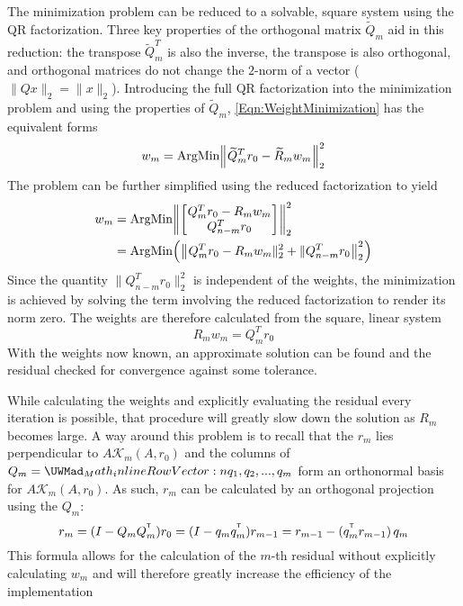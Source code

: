\documentclass[12pt]{UWMadThesis}
\begin{document}
The minimization problem can be reduced to a solvable, square system using the QR factorization.
Three key properties of the orthogonal matrix $\widetilde{Q}_m$ aid in this reduction: the transpose $\widetilde{Q}^T_m$ is also the inverse, the transpose is also orthogonal, and orthogonal matrices do not change the $2$-norm of a vector ($\|Qx\|_2 = \|x\|_2 $).
Introducing the full QR factorization into the minimization problem and using the properties of $\widetilde{Q}_m$, \cref{Eqn:WeightMinimization} has the equivalent forms
\begin{equation}
    w_m =\ArgMin\left\|\widetilde{Q}^T_m  r_0 - \widetilde{R}_m w_m \right\|_2^2
\end{equation}
The problem can be further simplified using the reduced factorization to yield
\begin{align*}
    w_m &= \ArgMin\left\|
                \begin{bmatrix}
                    Q^T_m  r_0 - R_m w_m \\
                    Q^T_{n-m} r_0
                \end{bmatrix}
            \right\|_2^2 \\
        &= \ArgMin  \left(
                        \left\|Q^T_m  r_0 - R_m w_m\|_2^2 + \|Q^T_{n-m}r_0\right\|_2^2
                    \right)
\end{align*}
Since the quantity $\|Q^T_{n-m}r_0\|_2^2$ is independent of the weights, the minimization is achieved by solving the term involving the reduced factorization to render its norm zero.
The weights are therefore calculated from the square, linear system
\begin{equation}
    R_m w_m = Q^T_m  r_0
\end{equation}
With the weights now known, an approximate solution can be found and the residual checked for convergence against some tolerance.

While calculating the weights and explicitly evaluating the residual every iteration is possible, that procedure will greatly slow down the solution as $R_m$ becomes large.
A way around this problem is to recall that the $r_m$ lies perpendicular to $A\mathcal{K}_m(A,r_0)$ and the columns of $Q_m = \irowvec{q_1,q_2,...,q_m}$ form an orthonormal basis for $A\mathcal{K}_m(A,r_0)$.
As such, $r_m$ can be calculated by an orthogonal projection using the $Q_m$:
\begin{equation}
    r_m = (I - Q_m \transpose{Q_m})r_0 = (I - q_m \transpose{q_m})r_{m-1} = r_{m-1} - (\transpose{q_m}r_{m-1})\,q_m
\end{equation}
This formula allows for the calculation of the $m$-th residual without explicitly calculating $w_m$ and will therefore greatly increase the efficiency of the implementation
\end{document}

